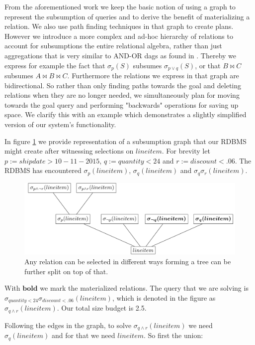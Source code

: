 From the aforementioned work we keep the basic notion of using a graph
to represent the subsumption of queries and to derive the benefit of
materializing a relation. We also use path finding techniques in that
graph to create plans. However we introduce a more complex and ad-hoc
hierarchy of relations to account for subsumptions the entire
relational algebra, rather than just aggregations that is very similar
to AND-OR dags as found in
\cite{mistryMaterializedViewSelection2001}. Thereby we express for
example the fact that \(\sigma_p(S)\) subsumes \(\sigma_{p \lor q}(S)\),
or that \(B \Join C\) subsumes \(A \Join B \Join C\). Furthermore the
relations we express in that graph are bidirectional. So rather than
only finding paths towards the goal and deleting relations when they
are no longer needed, we simultaneously plan for moving towards the
goal query and performing "backwards" operations for saving up
space. We clarify this with an example which demonstrates a slightly
simplified version of our system's functionality.

In figure \ref{fig:intro_selectexample} we provide representation of a subsumption
graph that our RDBMS might create after witnessing selections on
\(lineitem\). For brevity let \(p:=shipdate > 10-11-2015\),
\(q:=quantity < 24\) and \(r:=discount < .06\). The RDBMS has
encountered \(\sigma_{p}(lineitem)\), \(\sigma_{q}(lineitem)\) and
\(\sigma_{q} \sigma_{r} (lineitem)\).

\begin{figure}[p]
  \centering
  \includegraphics[width=.9\linewidth]{./imgs/intro_selectexample.pdf}
  \caption{\label{fig:intro_selectexample}Any relation can be selected in different ways forming a tree can be further split on top of that.}
\end{figure}

With \(\boldsymbol{bold}\) we mark the materialized relations. The query
that we are solving is \(\sigma_{quantity < 24} \sigma_{discount < .06}
(lineitem)\), which is denoted in the figure as \(\sigma_{q \land
  r}(lineitem)\). Our total size budget is 2.5.

Following the edges in the graph, to solve \(\sigma_{q \land
  r}(lineitem)\) we need \(\sigma_{q}(lineitem)\) and for that we need
\(lineitem\). So first the union:

